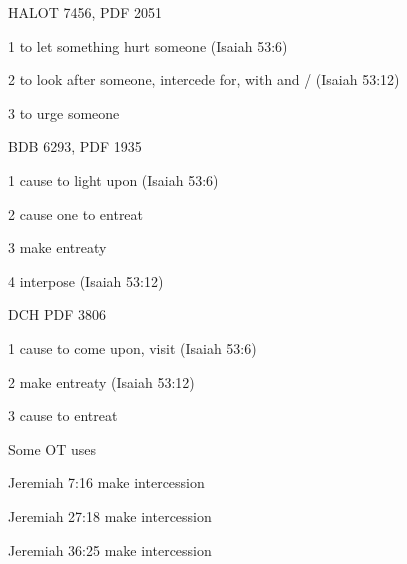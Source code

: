 				\begin{compactdesc}
					\item[HALOT 7456, PDF 2051] \textbf{}
						\begin{compactitem}
							\item[1] to let something hurt someone (Isaiah 53:6)
							\item[2] to look after someone, intercede for, with  and / (Isaiah 53:12)
							\item[3] to urge someone
						\end{compactitem}
					\item[BDB 6293, PDF 1935] \textbf{}
						\begin{compactitem}
							\item[1] cause to light upon (Isaiah 53:6) 
							\item[2] cause one to entreat
							\item[3] make entreaty
							\item[4] interpose (Isaiah 53:12)
						\end{compactitem}
					\item[DCH PDF 3806] \textbf{}
						\begin{compactitem}
							\item[1] cause to come upon, visit (Isaiah 53:6)
							\item[2] make entreaty (Isaiah 53:12)
							\item[3] cause to entreat
						\end{compactitem}
				\end{compactdesc}
				
				\begin{compactdesc}
					\item[Some OT uses] \textbf{}
						\begin{compactdesc}
							\item[Jeremiah 7:16] make intercession
							\item[Jeremiah 27:18] make intercession
							\item[Jeremiah 36:25] make intercession
						\end{compactdesc}
				\end{compactdesc}
			
		
